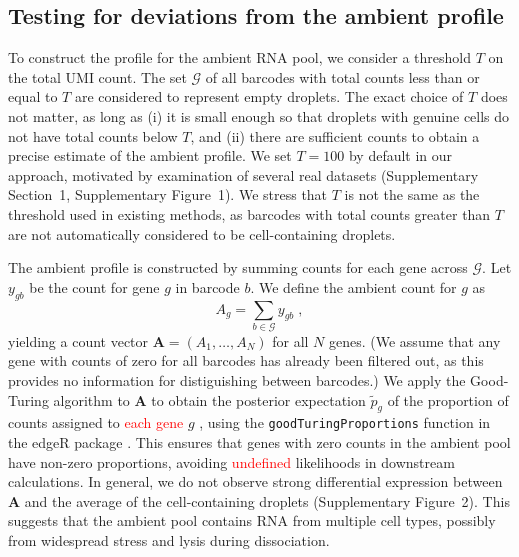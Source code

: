 \documentclass{bmcart}
\newcommand{\code}[1]{\texttt{#1}}
\newcommand{\revised}[1]{\textcolor{red}{#1}}
\newcommand{\suppfignegative}{1}
\newcommand{\suppfigambientma}{2}
\newcommand{\suppsecthreshold}{1}
\begin{document}
\subsection*{Testing for deviations from the ambient profile}
To construct the profile for the ambient RNA pool, we consider a threshold $T$ on the total UMI count.
The set $\mathcal{G}$ of all barcodes with total counts less than or equal to $T$ are considered to represent empty droplets.
The exact choice of $T$ does not matter, as long as (i) it is small enough so that droplets with genuine cells do not have total counts below $T$,
and (ii) there are sufficient counts to obtain a precise estimate of the ambient profile.
We set $T=100$ by default in our approach, motivated by examination of several real datasets (Supplementary Section~\suppsecthreshold{}, Supplementary Figure~\suppfignegative{}).
We stress that $T$ is not the same as the threshold used in existing methods, as barcodes with total counts greater than $T$ are not automatically considered to be cell-containing droplets.

The ambient profile is constructed by summing counts for each gene across $\mathcal{G}$.
Let $y_{gb}$ be the count for gene $g$ in barcode $b$.
We define the ambient count for $g$ as 
\[
    A_{g} = \sum_{b \in \mathcal{G}} y_{gb} \;,
\]
yielding a count vector $\mathbf{A} = (A_1, \dots, A_N)$ for all $N$ genes.
(We assume that any gene with counts of zero for all barcodes has already been filtered out, as this provides no information for distiguishing between barcodes.)
We apply the Good-Turing algorithm to $\mathbf{A}$ to obtain the posterior expectation $\tilde{p}_g$ of the proportion of counts assigned to \revised{each gene} $g$ \cite{gale1995good}, using the \code{goodTuringProportions} function in the \textsf{edgeR} package \cite{robinson2010edgeR}.
This ensures that genes with zero counts in the ambient pool have non-zero proportions, avoiding \revised{undefined} likelihoods in downstream calculations.
In general, we do not observe strong differential expression between $\mathbf{A}$ and the average of the cell-containing droplets (Supplementary Figure~\suppfigambientma{}).
This suggests that the ambient pool contains RNA from multiple cell types, possibly from widespread stress and lysis during dissociation.
\end{document}
